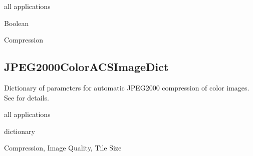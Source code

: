 \documentclass[letterpaper,12pt,english,openany,oneside]{sphinxmanual}
\begin{document}
\label{\detokenize{PDF_Create_CommonSettings:supported-by-33}}

all applications

\label{\detokenize{PDF_Create_CommonSettings:type-33}}

Boolean

\label{\detokenize{PDF_Create_CommonSettings:ui-name-24}}

Compression

\label{\detokenize{PDF_Create_CommonSettings:default-value-30}}

\begin{sphinxVerbatim}[commandchars=\\\{\}]
\end{sphinxVerbatim}




\subsection{JPEG2000ColorACSImageDict}
\label{\detokenize{PDF_Create_CommonSettings:jpeg2000coloracsimagedict}}
Dictionary of parameters for automatic JPEG2000 compression of color images. See  for details.

\label{\detokenize{PDF_Create_CommonSettings:supported-by-34}}

all applications

\label{\detokenize{PDF_Create_CommonSettings:type-34}}

dictionary

\label{\detokenize{PDF_Create_CommonSettings:ui-name-25}}

Compression, Image Quality, Tile Size

\label{\detokenize{PDF_Create_CommonSettings:default-value-31}}

\begin{sphinxVerbatim}[commandchars=\\\{\}]
    
\end{sphinxVerbatim}
\end{document}
